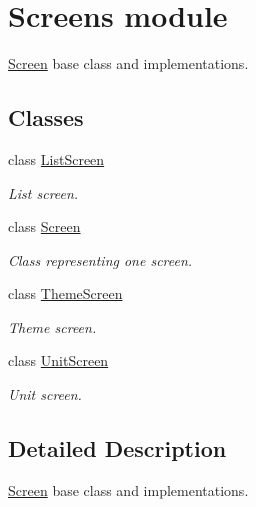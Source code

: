\hypertarget{group__screens}{}\section{Screens module}
\label{group__screens}


\mbox{\hyperlink{classScreen}{Screen}} base class and implementations.  


\subsection*{Classes}
\begin{DoxyCompactItemize}
\item 
class \mbox{\hyperlink{classListScreen}{List\+Screen}}
\begin{DoxyCompactList}\small\item\em List screen. \end{DoxyCompactList}\item 
class \mbox{\hyperlink{classScreen}{Screen}}
\begin{DoxyCompactList}\small\item\em Class representing one screen. \end{DoxyCompactList}\item 
class \mbox{\hyperlink{classThemeScreen}{Theme\+Screen}}
\begin{DoxyCompactList}\small\item\em Theme screen. \end{DoxyCompactList}\item 
class \mbox{\hyperlink{classUnitScreen}{Unit\+Screen}}
\begin{DoxyCompactList}\small\item\em Unit screen. \end{DoxyCompactList}\end{DoxyCompactItemize}


\subsection{Detailed Description}
\mbox{\hyperlink{classScreen}{Screen}} base class and implementations. 

